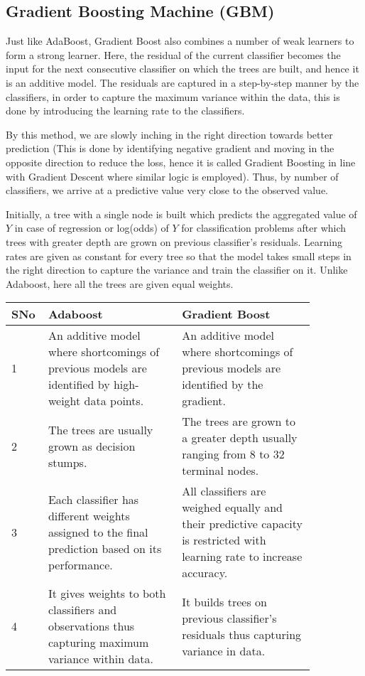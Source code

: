 \documentclass{article}
\begin{document}
\subsection{Gradient Boosting Machine (GBM)}

Just like AdaBoost, Gradient Boost also combines a number of weak learners to form a strong learner. Here, the residual of the current classifier becomes the input for the next consecutive classifier on which the trees are built, and hence it is an additive model. The residuals are captured in a step-by-step manner by the classifiers, in order to capture the maximum variance within the data, this is done by introducing the learning rate to the classifiers.

By this method, we are slowly inching in the right direction towards better prediction (This is done by identifying negative gradient and moving in the opposite direction to reduce the loss, hence it is called Gradient Boosting in line with Gradient Descent where similar logic is employed). Thus, by number of classifiers, we arrive at a predictive value very close to the observed value.

Initially, a tree with a single node is built which predicts the aggregated value of $Y$ in case of regression or log(odds) of $Y$ for classification problems after which trees with greater depth are grown on previous classifier's residuals. Learning rates are given as constant for every tree so that the model takes small steps in the right direction to capture the variance and train the classifier on it. Unlike Adaboost, here all the trees are given equal weights.


\begin{table}[hbt]
\begin{tabular}{p{0.05\linewidth} | p{0.4\linewidth} | p{0.4\linewidth}}
\hline
SNo & Adaboost & Gradient Boost \\
\hline
1&  An additive model where shortcomings of previous models are identified by high-weight data points. &  An additive model where shortcomings of previous models are identified by the gradient.  \\
 2&  The trees are usually grown as decision stumps. &  The trees are grown to a greater depth usually ranging from 8 to 32 terminal nodes.  \\
 3&  Each classifier has different weights assigned to the final prediction based on its performance. &   All classifiers are weighed equally and their predictive capacity is restricted with learning rate to increase accuracy. \\
 4&  It gives weights to both classifiers and observations thus capturing maximum variance within data. &  It builds trees on previous classifier's residuals thus capturing variance in data.  \\
 \hline   
\end{tabular}
\end{table}
\end{document}
